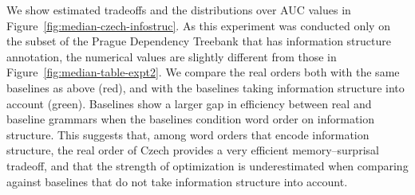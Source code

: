 We show estimated tradeoffs and the distributions over AUC values in Figure~\ref{fig:median-czech-infostruc}.
As this experiment was conducted only on the subset of the Prague Dependency Treebank that has information structure annotation, the numerical values are slightly different from those in Figure~\ref{fig:median-table-expt2}. We compare the real orders both with the same baselines as above (red), and with the baselines taking information structure into account (green).
Baselines show a larger gap in efficiency between real and baseline grammars when the baselines condition word order on information structure.
This suggests that, among word orders that encode information structure, the real order of Czech provides a very efficient memory--surprisal tradeoff, and that the strength of optimization is underestimated when comparing against baselines that do not take information structure into account.


